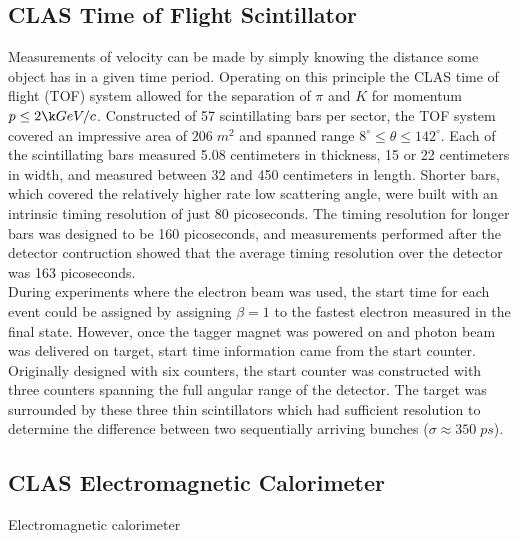 \subsection{CLAS Time of Flight Scintillator}
Measurements of velocity can be made by simply knowing the distance some object has in a given time period.  Operating on this principle the CLAS time of flight (TOF) system allowed for the separation of $\pi$ and $K$ for momentum $p \leq 2 \k GeV/c$.  Constructed of 57 scintillating bars per sector, the TOF system covered an impressive area of $206 \; m^2$ and spanned range $8^\circ \leq \theta \leq 142^\circ$.  Each of the scintillating bars measured 5.08 centimeters in thickness, 15 or 22 centimeters in width, and measured between 32 and 450 centimeters in length.  Shorter bars, which covered the relatively higher rate low scattering angle, were built with an intrinsic timing resolution of just 80 picoseconds.  The timing resolution for longer bars was designed to be 160 picoseconds, and measurements performed after the detector contruction showed that the average timing resolution over the detector was 163 picoseconds.\\
During experiments where the electron beam was used, the start time for each event could be assigned by assigning $\beta = 1$ to the fastest electron measured in the final state.  However, once the tagger magnet was powered on and photon beam was delivered on target, start time information came from the start counter.  Originally designed with six counters, the start counter was constructed with three counters spanning the full angular range of the detector.  The target was surrounded by these three thin scintillators which had sufficient resolution to determine the difference between two sequentially arriving bunches ($\sigma \approx 350 \; ps$). 

\subsection{CLAS Electromagnetic Calorimeter}
Electromagnetic calorimeter

